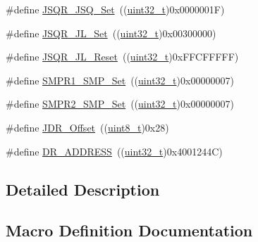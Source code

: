 \begin{DoxyCompactItemize}
\item 
\#define \hyperlink{group___a_d_c___private___defines_ga5d460390dbe3b400b5e0fdf1e94929f0}{J\+S\+Q\+R\+\_\+\+J\+S\+Q\+\_\+\+Set}~((\hyperlink{_p_e___types_8h_a33594304e786b158f3fb30289278f5af}{uint32\+\_\+t})0x0000001\+F)
\item 
\#define \hyperlink{group___a_d_c___private___defines_ga46af9e738702305be0127f6c15c4f7b0}{J\+S\+Q\+R\+\_\+\+J\+L\+\_\+\+Set}~((\hyperlink{_p_e___types_8h_a33594304e786b158f3fb30289278f5af}{uint32\+\_\+t})0x00300000)
\item 
\#define \hyperlink{group___a_d_c___private___defines_gac8d1173791ea10bac7c53a368d593a16}{J\+S\+Q\+R\+\_\+\+J\+L\+\_\+\+Reset}~((\hyperlink{_p_e___types_8h_a33594304e786b158f3fb30289278f5af}{uint32\+\_\+t})0x\+F\+F\+C\+F\+F\+F\+F\+F)
\item 
\#define \hyperlink{group___a_d_c___private___defines_ga244048ec3ba9461a6609942def9a15ba}{S\+M\+P\+R1\+\_\+\+S\+M\+P\+\_\+\+Set}~((\hyperlink{_p_e___types_8h_a33594304e786b158f3fb30289278f5af}{uint32\+\_\+t})0x00000007)
\item 
\#define \hyperlink{group___a_d_c___private___defines_ga6555beb1970c42125678d80530bba4d3}{S\+M\+P\+R2\+\_\+\+S\+M\+P\+\_\+\+Set}~((\hyperlink{_p_e___types_8h_a33594304e786b158f3fb30289278f5af}{uint32\+\_\+t})0x00000007)
\item 
\#define \hyperlink{group___a_d_c___private___defines_ga5671a68d6f0d01c6c465ee7a3a8f3eea}{J\+D\+R\+\_\+\+Offset}~((\hyperlink{_p_e___types_8h_aba7bc1797add20fe3efdf37ced1182c5}{uint8\+\_\+t})0x28)
\item 
\#define \hyperlink{group___a_d_c___private___defines_ga35ecb1c96cfae175f5f00490e5e91e88}{D\+R\+\_\+\+A\+D\+D\+R\+E\+SS}~((\hyperlink{_p_e___types_8h_a33594304e786b158f3fb30289278f5af}{uint32\+\_\+t})0x4001244\+C)
\end{DoxyCompactItemize}


\subsection{Detailed Description}


\subsection{Macro Definition Documentation}
